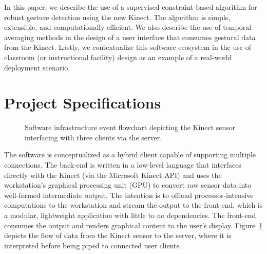 \documentclass{scrartcl}
\begin{document}
    In this paper, we describe the use of a supervised constraint-based algorithm for robust gesture detection using the new Kinect. The algorithm is simple, extensible, and computationally efficient. We also describe the use of temporal averaging methods in the design of a user interface that consumes gestural data from the Kinect. Lastly, we contextualize this software ecosystem in the use of classroom (or instructional facility) design as an example of a real-world deployment scenario.
  \section{Project Specifications}
    \begin{figure}[ht!]
      \centering
      \caption{Software infrastructure event flowchart depicting the Kinect sensor interfacing with three clients via the server.\label{fig:pipeline}}
    \end{figure}
    The software is conceptualized as a hybrid client capable of supporting multiple connections. The back-end is written in a low-level language that interfaces directly with the Kinect (via the Microsoft Kinect API) and uses the workstation's graphical processing unit (GPU) to convert raw sensor data into well-formed intermediate output. The intention is to offload processor-intensive computations to the workstation and stream the output to the front-end, which is a modular, lightweight application with little to no dependencies. The front-end consumes the output and renders graphical content to the user's display. Figure~\ref{fig:pipeline} depicts the flow of data from the Kinect sensor to the server, where it is interpreted before being piped to connected user clients.
\end{document}
